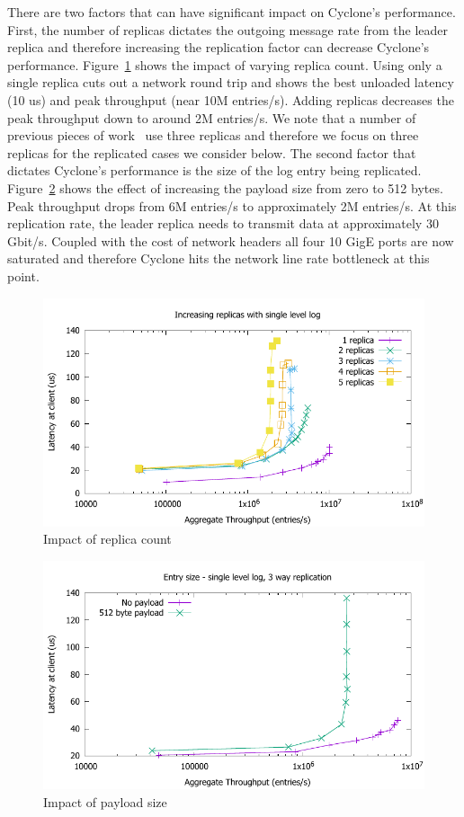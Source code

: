 \documentclass[10pt, preprint, nonatbib]{sigplanconf}
\begin{document}
There are two factors that can have significant impact on Cyclone's
performance. First, the number of replicas dictates the outgoing message rate
from the leader replica and therefore increasing the replication factor can
decrease Cyclone's performance. Figure~\ref{fig:replicas} shows the impact of
varying replica count. Using only a single replica cuts out a network round trip
and shows the best unloaded latency (10 us) and peak throughput (near 10M
entries/s). Adding replicas decreases the peak throughput down to around 2M
entries/s. We note that a number of previous pieces of work~\cite{faast, farm}
use three replicas and therefore we focus on three replicas for the replicated
cases we consider below. The second factor that dictates Cyclone's performance
is the size of the log entry being replicated. Figure~\ref{fig:payload} shows
the effect of increasing the payload size from zero to 512 bytes. Peak
throughput drops from 6M entries/s to approximately 2M entries/s. At this
replication rate, the leader replica needs to transmit data at approximately 30
Gbit/s. Coupled with the cost of network headers all four 10 GigE ports are now
saturated and therefore Cyclone hits the network line rate bottleneck at this
point.

\begin{figure}
\includegraphics[scale=0.6]{results2/replicas.pdf}
\caption{Impact of replica count}
\label{fig:replicas}
\end{figure}

\begin{figure}
\includegraphics[scale=0.6]{results2/512.pdf}
\caption{Impact of payload size}
\label{fig:payload}
\end{figure}
\end{document}
